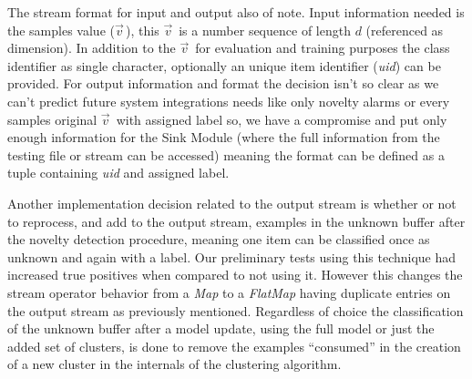 \newcommand{\val}{$\vec{v}\,$\xspace}
The stream format for input and output also of note.
Input information needed is the samples value (\val), this \val is a number
sequence of length $d$ (referenced as dimension).
In addition to the \val for evaluation and training purposes the class
identifier as single character, optionally an unique item identifier
(\emph{uid}) can be provided.
For output information and format the decision isn't so clear as we can't
predict future system integrations needs like only novelty alarms or every
samples original \val with assigned label so, we have a compromise and put only
enough information for the Sink Module (where the full information
from the testing file or stream can be accessed) meaning the format can be
defined as a tuple containing \emph{uid} and assigned label.


Another implementation decision related to the output stream is whether or not
to reprocess, and add to the output stream, examples in the unknown buffer after
the novelty detection procedure, meaning one item can be classified once as
unknown and again with a label.
Our preliminary tests using this technique had increased true positives when compared to
not using it.
However this changes the stream operator behavior from a \textit{Map} to a
\textit{FlatMap} having duplicate entries on the output stream as previously
mentioned.
Regardless of choice the classification of the unknown buffer after a model
update, using the full model or just the added set of clusters, is done to
remove the examples ``consumed'' in the creation of a new cluster in the internals
of the clustering algorithm.


